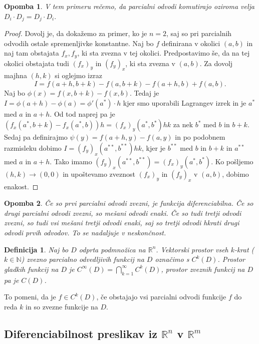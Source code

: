 \documentclass[10pt, a4paper]{article}
\newtheorem{defi}{Definicija}[section]
\newenvironment{noticeB}{%
  \tcolorbox[%
  notitle,
  empty,
  enhanced,  %
  breakable,
  coltext=black,
  colback=white, 
  fontupper=\rmfamily,
  parbox=false,
  noparskip,
  sharp corners,
  boxrule=-1pt,  %
  frame hidden,
  left=7pt,  %
  right=7pt,
  top=5pt,
  bottom=5pt,
  before skip=2.5ex plus 2pt,
  after skip=2.5ex plus 2pt,
  borderline west = {1.5pt}{-0.1pt}{blue!30!black}, %
  overlay unbroken and last={%
    \draw[color=black, line width=1.25pt]
    ($(frame.south west)+(1.pt, -0.1pt)$) -- ++(2em, 0);
  }
  ]}
{\endtcolorbox}
\newenvironment{definicija}{\begin{defi}\begin{noticeB}}{%
    \end{noticeB}\end{defi}}
\newtheorem*{opomba}{Opomba}
\newenvironment{noticeC}{%
  \tcolorbox[%
  notitle,
  empty,
  enhanced,  %
  breakable,
  coltext=black, 
  fontupper=\rmfamily,
  parbox=false,
  noparskip,
  sharp corners,
  boxrule=-1pt,  %
  frame hidden,
  left=7pt,  %
  right=7pt,
  top=5pt,
  bottom=5pt,
  before skip=2.5ex plus 2pt,
  after skip=2.5ex plus 2pt,
  overlay unbroken and last={%
  },
  ]}
{\endtcolorbox}
\newenvironment{dokaz}%
  {\begin{noticeC}\begin{proof}}%
  {\end{proof}\end{noticeC}}
\newcommand{\N}{\mathbb {N}}
\newcommand{\R}{\mathbb {R}}
\begin{document}
\begin{opomba}
    V tem primeru rečemo, da parcialni odvodi komutirajo oziroma velja $D_i \cdot D_j = D_j \cdot D_i.$
\end{opomba}

\begin{dokaz}
    Dovolj je, da dokažemo za primer, ko je $n = 2$,
    saj so pri parcialnih odvodih ostale spremenljivke konstantne.
    Naj bo $f$ definirana v okolici $(a, b)$ in naj tam obstajata $f_x, f_y$, ki sta zvezna v tej okolici.
    Predpostavimo še, da na tej okolici obstajata tudi $(f_x)_y$ in $(f_y)_x$, ki sta zvezna v $(a, b)$.
    Za dovolj majhna $(h, k)$ si oglejmo izraz $$I = f(a+h, b + k) - f(a, b+ k) - f(a + h, b) + f(a, b).$$
    Naj bo $\phi(x) = f(x, b + k) - f(x, b)$. Tedaj je $I = \phi(a + h) - \phi(a) = \phi'(a^*) \cdot h$
    kjer smo uporabili Lagrangev izrek in je $a^*$ med $a$ in $a + h$. Od tod naprej pa je
    $\left(f_x (a^*, b + k) - f_x (a^*, b)\right) h = (f_x)_y (a^*, b^*) hk$
    za nek $b^*$ med $b$ in $b + k$.
    Sedaj pa definirajmo $\psi(y) = f(a + h,y) - f(a, y)$ in po podobnem razmisleku 
    dobimo $I = (f_y)_x (a^{**}, b^{**}) hk$, kjer je $b^{**}$ med $b$ in $b + k$ 
    in $a^{**}$ med $a$ in $a + h$.
    Tako imamo $(f_y)_x (a^{**}, b^{**})= (f_x)_y (a^*, b^*)$. Ko pošljemo $(h, k) \to (0,0)$
    in upoštevamo zveznost $(f_x)_y$ in $(f_y)_x$ v $(a, b)$, dobimo enakost.
\end{dokaz}

\begin{opomba}
    Če so prvi parcialni odvodi zvezni, je funkcija diferenciabilna.
    Če so drugi parcialni odvodi zvezni, so mešani odvodi enaki.
    Če so tudi tretji odvodi zvezni, so tudi vsi mešani tretji odvodi enaki,
    saj so tretji odvodi hkrati drugi odvodi prvih odvodov. 
    To se nadaljuje v neskončnost.
\end{opomba}

\begin{definicija}
    Naj bo $D$ odprta podmnožica na $\R^n$. Vektorski prostor vseh $k$-krat ($k \in \N$)
    zvezno parcialno odvedljivih funkcij na $D$ označimo s $C^k(D)$.
    Prostor gladkih funkcij na $D$ je $C^{\infty} (D) = \bigcap_{k = 1} ^\infty C^k (D)$,
    prostor zveznih funkcij na $D$ pa je $C(D)$.
\end{definicija}

To pomeni, da je $f \in C^k (D)$, če obstajajo vsi parcialni odvodi funkcije $f$ 
do reda $k$ in so zvezne funkcije na $D$.

\subsection{Diferenciabilnost preslikav iz $\R^n$ v $\R^m$}
\end{document}
